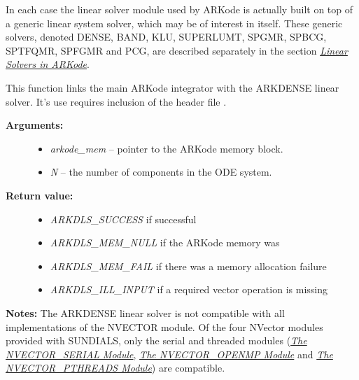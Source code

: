 \documentclass[letterpaper,10pt,english]{sphinxmanual}
\begin{document}
In each case the linear solver module used by ARKode is actually built
on top of a generic linear system solver, which may be of interest in
itself. These generic solvers, denoted DENSE, BAND, KLU, SUPERLUMT,
SPGMR, SPBCG, SPTFQMR, SPFGMR and PCG, are described separately in the
section {\hyperref[linear_solvers/index:linearsolvers]{\emph{Linear Solvers in ARKode}}}.

\begin{fulllineitems}
\label{c_interface/User_callable:ARKDense}
This function links the main ARKode integrator with the ARKDENSE
linear solver.  It's use requires inclusion of the header file
.
\begin{description}
\item[{\textbf{Arguments:}}] \leavevmode\begin{itemize}
\item {} 
\emph{arkode\_mem} -- pointer to the ARKode memory block.

\item {} 
\emph{N} -- the number of components in the ODE system.

\end{itemize}

\item[{\textbf{Return value:}}] \leavevmode\begin{itemize}
\item {} 
\emph{ARKDLS\_SUCCESS}   if successful

\item {} 
\emph{ARKDLS\_MEM\_NULL}  if the ARKode memory was 

\item {} 
\emph{ARKDLS\_MEM\_FAIL}  if there was a memory allocation failure

\item {} 
\emph{ARKDLS\_ILL\_INPUT} if a required vector operation is missing

\end{itemize}

\end{description}

\textbf{Notes:}  The ARKDENSE linear solver is not compatible with
all implementations of the NVECTOR module. Of the four NVector
modules provided with SUNDIALS, only the serial and threaded
modules ({\hyperref[nvectors/NVector_Serial:nvectors-nvserial]{\emph{The NVECTOR\_SERIAL Module}}}, {\hyperref[nvectors/NVector_OpenMP:nvectors-openmp]{\emph{The NVECTOR\_OPENMP Module}}} and
{\hyperref[nvectors/NVector_Pthreads:nvectors-pthreads]{\emph{The NVECTOR\_PTHREADS Module}}}) are compatible.

\end{fulllineitems}
\end{document}
